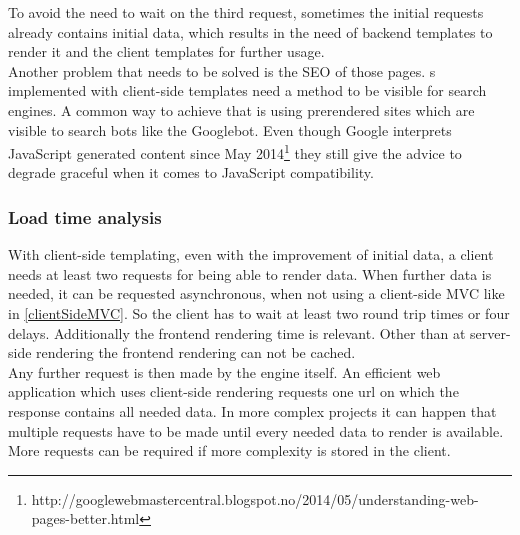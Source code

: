 \noindent{}To avoid the need to wait on the third request, sometimes the initial requests already contains initial data, which results in the need of backend templates to render it and the client templates for further usage.
\\
Another problem that needs to be solved is the SEO of those pages.
\WebPage{}s implemented with client-side templates need a method to be visible for search engines.
A common way to achieve that is using prerendered sites which are visible to search bots like the Googlebot.
Even though Google interprets JavaScript generated content since May 2014\footnote{http://googlewebmastercentral.blogspot.no/2014/05/understanding-web-pages-better.html} they still give the advice to degrade graceful when it comes to JavaScript compatibility.

\subsubsection{Load time analysis}
With client-side templating, even with the improvement of initial data, a client needs at least two requests for being able to render data.
When further data is needed, it can be requested asynchronous, when not using a client-side MVC like in \ref{clientSideMVC}.
So the client has to wait at least two round trip times or four delays.
Additionally the frontend rendering time is relevant.
Other than at server-side rendering the frontend rendering can not be cached.
\\
Any further request is then made by the \ajax{} engine itself.
An efficient web application which uses client-side rendering requests one url on which the response contains all needed data.
In more complex projects it can happen that multiple requests have to be made until every needed data to render is available.
\\
More requests can be required if more complexity is stored in the client.


